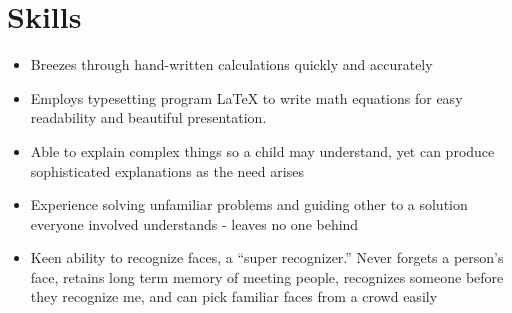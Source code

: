 \documentclass{article}
\begin{document}
\section{Skills}
\begin{itemize} 
\item Breezes through hand-written calculations quickly and accurately
\item Employs typesetting program LaTeX to write math equations for easy readability and beautiful presentation.
\item Able to explain complex things so a child may understand, yet can produce sophisticated explanations as the need arises
\item Experience solving unfamiliar problems and guiding other to a solution everyone involved understands - leaves no one behind
\item Keen ability to recognize faces, a “super recognizer.” Never forgets a person's face, retains long term memory of meeting people, recognizes someone before they recognize me, and can pick familiar faces from a crowd easily

\end{itemize}
\end{document}
